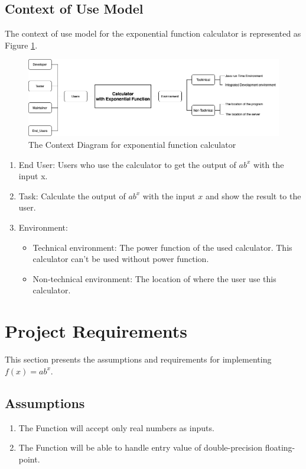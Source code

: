 \documentclass[11pt]{article}
\begin{document}
\subsection{Context of Use Model}
The context of use model for the exponential function calculator\cite{zelen1966application}\cite{lebanon2001boosting} is represented as Figure \ref{fig:context}.
\begin{figure}[h]
    \centering
    \includegraphics[width=14cm]{images/Context_diagram.png}
    \caption{The Context Diagram for exponential function calculator}
    \label{fig:context}
\end{figure}

\begin{enumerate}
\item End User: Users who use the calculator to get the output of $ab^x$ with the input x.
\item Task: Calculate the output of $ab^x$ with the input $x$ and show the result to the user.
\item
Environment:
\begin{itemize}
\item Technical environment:
The power function of the used calculator. This calculator can't be used without power function.
\item Non-technical environment:
The location of where the user use this calculator.
\end{itemize}
\end{enumerate}

\section{Project Requirements}\label{problem2}
This section presents the assumptions and requirements\cite{iso2018ieee} for implementing $f(x)=ab^x$.
\subsection{Assumptions}
\begin{enumerate}
    \item The Function will accept only real numbers as inputs.
    \item The Function will be able to handle entry value of double-precision floating-point.
\end{enumerate}
\end{document}
